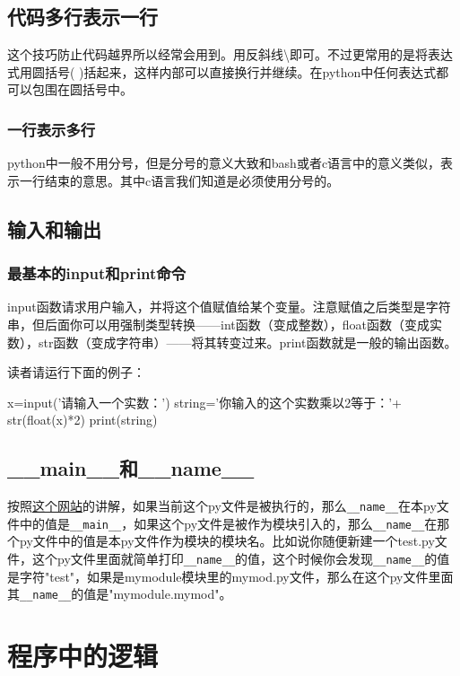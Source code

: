 \documentclass[12pt,oneside]{book}
\begin{document}
\begin{common-format}
\section{代码多行表示一行}
这个技巧防止代码越界所以经常会用到。用反斜线\textbackslash 即可。不过更常用的是将表达式用圆括号( )括起来，这样内部可以直接换行并继续。在python中任何表达式都可以包围在圆括号中。

\subsection{一行表示多行}
python中一般不用分号，但是分号的意义大致和bash或者c语言中的意义类似，表示一行结束的意思。其中c语言我们知道是必须使用分号的。



\section{输入和输出}
\subsection{最基本的input和print命令}
input函数请求用户输入，并将这个值赋值给某个变量。注意赋值之后类型是字符串，但后面你可以用强制类型转换——int函数（变成整数），float函数（变成实数），str函数（变成字符串）——将其转变过来。print函数就是一般的输出函数。

读者请运行下面的例子：
\begin{tcbpython}[]
x=input('请输入一个实数：')
string='你输入的这个实数乘以2等于：'+ str(float(x)*2)
print(string)
\end{tcbpython}


\section{\_{}\_{}main\_{}\_{}和\_{}\_{}name\_{}\_{}}
按照\href{http://stackoverflow.com/questions/419163/what-does-if-name-main-do}{这个网站}的讲解，如果当前这个py文件是被执行的，那么\verb+__name__+在本py文件中的值是\verb+__main__+，如果这个py文件是被作为模块引入的，那么\verb+__name__+在那个py文件中的值是本py文件作为模块的模块名。比如说你随便新建一个test.py文件，这个py文件里面就简单打印\verb+__name__+的值，这个时候你会发现\verb+__name__+的值是字符"test"，如果是mymodule模块里的mymod.py文件，那么在这个py文件里面其\verb+__name__+的值是"mymodule.mymod"。



\chapter{程序中的逻辑}

\end{common-format}
\end{document}
